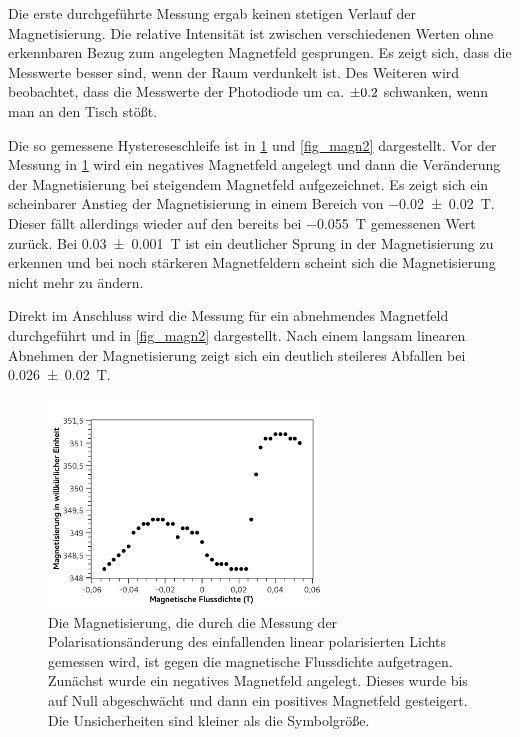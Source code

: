 \documentclass[
	a4paper,
	12pt,
	pagesize,
	ngerman
]{scrartcl}
\begin{document}
	Die erste durchgeführte Messung ergab keinen stetigen Verlauf der Magnetisierung. %
	Die relative Intensität ist zwischen verschiedenen Werten ohne erkennbaren Bezug zum angelegten Magnetfeld gesprungen.
	Es zeigt sich, dass die Messwerte besser sind, wenn der Raum verdunkelt ist. %
	Des Weiteren wird beobachtet, dass die Messwerte der Photodiode um ca. $\SI{\pm0,2}{}$ schwanken, wenn man an den Tisch stößt.

	Die so gemessene Hystereseschleife ist in \cref{fig_magn1} und \cref{fig_magn2} dargestellt.
	Vor der Messung in \cref{fig_magn1} wird ein negatives Magnetfeld angelegt und dann die Veränderung der Magnetisierung bei steigendem Magnetfeld aufgezeichnet. %
	Es zeigt sich ein scheinbarer Anstieg der Magnetisierung in einem Bereich von \SI{-0,02+-0,02}{T}. 
	Dieser fällt allerdings wieder auf den bereits bei \SI{-0,055}{T} gemessenen Wert zurück.
	Bei \SI{0,03+-0,001}{T} ist ein deutlicher Sprung in der Magnetisierung zu erkennen und bei noch stärkeren Magnetfeldern scheint sich die Magnetisierung nicht mehr zu ändern.

	Direkt im Anschluss wird die Messung für ein abnehmendes Magnetfeld durchgeführt und in \cref{fig_magn2} dargestellt.
	Nach einem langsam linearen Abnehmen der Magnetisierung zeigt sich ein deutlich steileres Abfallen bei \SI{0,026+-0,02}{T}.
	

	
	\begin{figure}[H]  %
		\includegraphics[width=0.65\textwidth]{fig_magn1} %
		\centering
		\caption{Die Magnetisierung, die durch die Messung der Polarisationsänderung des einfallenden linear polarisierten Lichts gemessen wird, ist gegen die magnetische Flussdichte aufgetragen. Zunächst wurde ein negatives Magnetfeld angelegt. Dieses wurde bis auf Null abgeschwächt und dann ein positives Magnetfeld gesteigert. Die Unsicherheiten sind kleiner als die Symbolgröße.} %
		\label{fig_magn1}
		\centering
	\end{figure}
\end{document}
